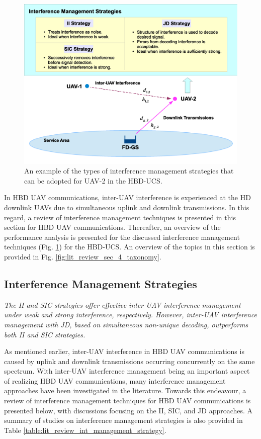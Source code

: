 \begin{figure} [h]
\centering
\includegraphics [width=0.6\columnwidth]{chap2_fig/interference_management_example.eps} 
\caption{An example of the types of interference management strategies that can be adopted for UAV-2 in the HBD-UCS.}
\label{fig:lit_review_interference_management_example}
\end{figure}

In HBD UAV communications, inter-UAV interference is experienced at the HD downlink UAVs due to simultaneous uplink and downlink transmissions. In this regard, a review of interference management techniques is presented in this section for HBD UAV communications. Thereafter, an overview of the performance analysis is presented for the discussed interference management techniques (Fig. \ref{fig:lit_review_interference_management_example}) for the HBD-UCS. An overview of the topics in this section is provided in Fig. \ref{fig:lit_review_sec_4_taxonomy}.

\subsection{Interference Management Strategies}
\begin{summary} \emph{
\emph{The II and SIC strategies offer effective inter-UAV interference management under weak and strong interference, respectively. However, inter-UAV interference management with JD, based on simultaneous non-unique decoding, outperforms both II and SIC strategies. 
}}
\end{summary}
As mentioned earlier, inter-UAV interference in HBD UAV communications is caused by uplink and downlink transmissions occurring concurrently on the same spectrum. With inter-UAV interference management being an important aspect of realizing HBD UAV communications, many interference management approaches have been investigated in the literature. Towards this endeavour, a review of interference management techniques for HBD UAV communications is presented below, with discussions focusing on the II, SIC, and JD approaches. A summary of studies on interference management strategies is also provided in Table \ref{table:lit_review_int_management_strategy}.

